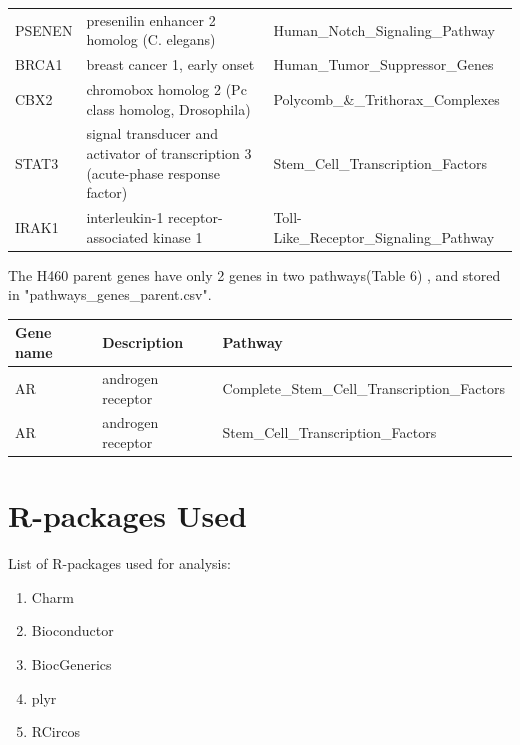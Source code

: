 \documentclass[11pt]{article}
\begin{document}
\begin{table}[H]
{\begin{tabular}{|l|l|l|}
    PSENEN & presenilin enhancer 2 homolog (C. elegans)                                            & Human\_Notch\_Signaling\_Pathway         \\
    BRCA1  & breast cancer 1, early onset                                                          & Human\_Tumor\_Suppressor\_Genes          \\
    CBX2   & chromobox homolog 2 (Pc class homolog, Drosophila)                                    & Polycomb\_\&\_Trithorax\_Complexes       \\
    STAT3  & signal transducer and activator of transcription 3 (acute-phase response factor)      & Stem\_Cell\_Transcription\_Factors       \\
    IRAK1  & interleukin-1 receptor-associated kinase 1                                            & Toll-Like\_Receptor\_Signaling\_Pathway  \\ \hline
    \end{tabular}}
\end{table}


The H460 parent genes have only 2 genes in two pathways(Table 6) , and stored in "pathways\_genes\_parent.csv".

\begin{table}[H]
    \begin{tabular}{|l|l|l|}
    \hline
    {\bf Gene name} & {\bf Description}       & {\bf Pathway}                                  \\ \hline
    AR   & androgen receptor & Complete\_Stem\_Cell\_Transcription\_Factors \\ 
    AR   & androgen receptor & Stem\_Cell\_Transcription\_Factors       \\ \hline
    \end{tabular}
\end{table}




\section*{R-packages Used}

List of R-packages used for analysis:
\begin{enumerate}

\item Charm

\item Bioconductor

\item BiocGenerics

\item plyr

\item RCircos

\end{enumerate}
\end{document}
